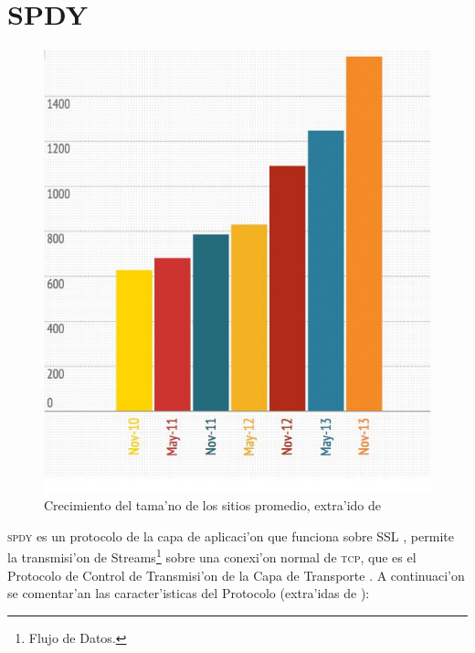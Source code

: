 \documentclass[a4paper,11pt,twocolumn]{article}
\begin{document}
\section{SPDY}
\begin{figure}[h!]
  	\centering
	\includegraphics[scale=0.4]{151tammy}
	\caption{\small Crecimiento del tama'no de los sitios promedio, extra'ido de \cite{tammy}}
	\label{average}
\end{figure}
\textsc{spdy}\cite{SPDYWhitepaper} es un protocolo de la capa de aplicaci'on \cite{illustratedTCPIP} que funciona sobre SSL \cite{rfcSSL}, permite la transmisi'on de Streams\footnote{Flujo de Datos.} sobre una conexi'on normal de \textsc{tcp}, que es el Protocolo de Control de Transmisi'on de la Capa de Transporte \cite{illustratedTCPIP}. A continuaci'on se comentar'an las caracter'isticas del Protocolo (extra'idas de \cite{SPDYWhitepaper}):
\end{document}
